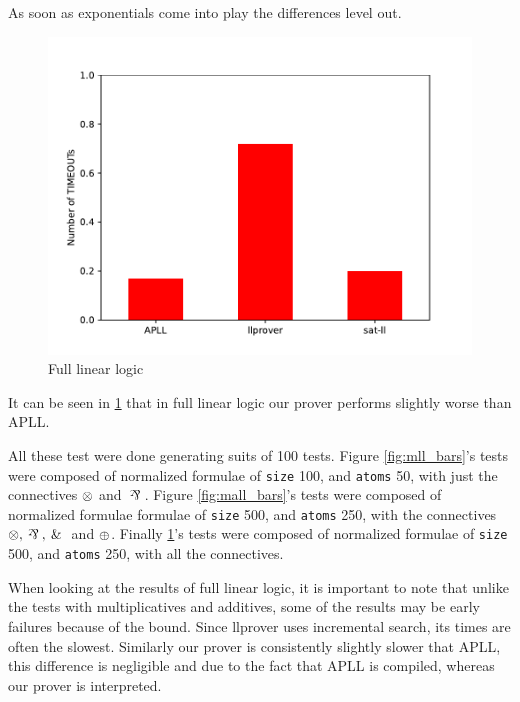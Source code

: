 \documentclass[a4paper, 12pt, tesi, english]{report}
\begin{document}
As soon as exponentials come into play the differences level out.
\begin{figure}[h!]
	\centering
	\includegraphics[scale=0.5]{./images/cll-500-250.pdf}
	\caption{Full linear logic}
	\label{fig:cll_bars}
\end{figure}
It can be seen in \ref{fig:cll_bars} that in full linear logic our prover performs slightly worse than APLL.

All these test were done generating suits of 100 tests.
Figure \ref{fig:mll_bars}'s tests were composed of normalized formulae of \texttt{size} 100, and \texttt{atoms} 50, with just the connectives $\otimes$ and $\llpar$.
Figure \ref{fig:mall_bars}'s tests were composed of normalized formulae formulae of \texttt{size} 500, and \texttt{atoms} 250, with the connectives $\llten, \llpar, \llwith$ and $\oplus$.
Finally \ref{fig:cll_bars}'s tests were composed of normalized formulae of \texttt{size} 500, and \texttt{atoms} 250, with all the connectives.

When looking at the results of full linear logic, it is important to note that unlike the tests with multiplicatives and additives, some of the results may be early failures because of the bound.
Since llprover uses incremental search, its times are often the slowest.
Similarly our prover is consistently slightly slower that APLL, this difference is negligible and due to the fact that APLL is compiled, whereas our prover is interpreted.




\end{document}

